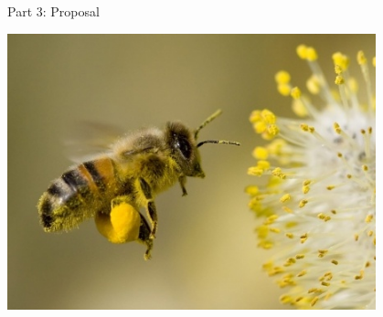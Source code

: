 \documentclass[presentation]{beamer}
\begin{document}
\begin{frame}[label=sec-1]{Part 3: Proposal}
 \begin{center}
   \includegraphics[width=0.8\textwidth]{figs/bee3.jpg}
 \end{center}
\end{frame}
\end{document}
